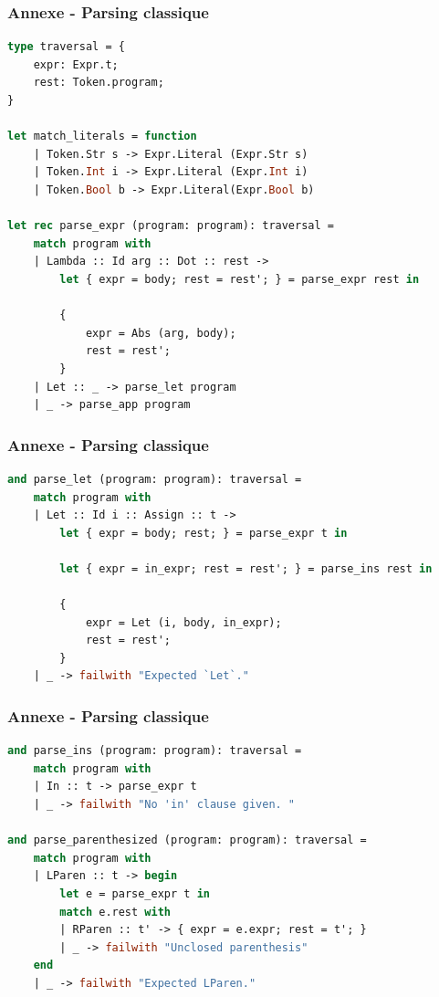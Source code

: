 \documentclass{beamer}
\begin{document}
\begin{frame}[fragile]
		\frametitle{Annexe - Parsing classique}
		\begin{lstlisting}[language=ML]
type traversal = {
    expr: Expr.t;
    rest: Token.program;
}

let match_literals = function
    | Token.Str s -> Expr.Literal (Expr.Str s)
    | Token.Int i -> Expr.Literal (Expr.Int i)
    | Token.Bool b -> Expr.Literal(Expr.Bool b)

let rec parse_expr (program: program): traversal =
    match program with
    | Lambda :: Id arg :: Dot :: rest ->
        let { expr = body; rest = rest'; } = parse_expr rest in 

        {
            expr = Abs (arg, body);
            rest = rest';
        }
    | Let :: _ -> parse_let program
    | _ -> parse_app program
		\end{lstlisting}
\end{frame}

\begin{frame}[fragile]
		\frametitle{Annexe - Parsing classique}
		\begin{lstlisting}[language=ML]
and parse_let (program: program): traversal =
    match program with
    | Let :: Id i :: Assign :: t -> 
        let { expr = body; rest; } = parse_expr t in

        let { expr = in_expr; rest = rest'; } = parse_ins rest in

        {
            expr = Let (i, body, in_expr);
            rest = rest';
        }
    | _ -> failwith "Expected `Let`."
		\end{lstlisting}
\end{frame}
\begin{frame}[fragile]
		\frametitle{Annexe - Parsing classique}
		\begin{lstlisting}[language=ML]
and parse_ins (program: program): traversal =
    match program with
    | In :: t -> parse_expr t
    | _ -> failwith "No 'in' clause given. "

and parse_parenthesized (program: program): traversal =
    match program with
    | LParen :: t -> begin
        let e = parse_expr t in
        match e.rest with
        | RParen :: t' -> { expr = e.expr; rest = t'; }
        | _ -> failwith "Unclosed parenthesis"
    end
    | _ -> failwith "Expected LParen."
		\end{lstlisting}
\end{frame}
\end{document}
